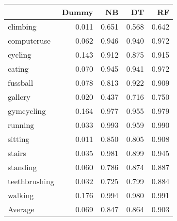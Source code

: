 \begin{tabular}{lrrrr}
\toprule
{} &  Dummy &    NB &    DT &    RF \\
\midrule
climbing      &  0.011 & 0.651 & 0.568 & 0.642 \\
computeruse   &  0.062 & 0.946 & 0.940 & 0.972 \\
cycling       &  0.143 & 0.912 & 0.875 & 0.915 \\
eating        &  0.070 & 0.945 & 0.941 & 0.972 \\
fussball      &  0.078 & 0.813 & 0.922 & 0.909 \\
gallery       &  0.020 & 0.437 & 0.716 & 0.750 \\
gymcycling    &  0.164 & 0.977 & 0.955 & 0.979 \\
running       &  0.033 & 0.993 & 0.959 & 0.990 \\
sitting       &  0.011 & 0.850 & 0.805 & 0.908 \\
stairs        &  0.035 & 0.981 & 0.899 & 0.945 \\
standing      &  0.060 & 0.786 & 0.874 & 0.887 \\
teethbrushing &  0.032 & 0.725 & 0.799 & 0.884 \\
walking       &  0.176 & 0.994 & 0.980 & 0.991 \\
Average       &  0.069 & 0.847 & 0.864 & 0.903 \\
\bottomrule
\end{tabular}
